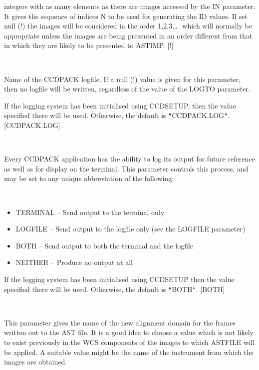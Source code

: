 \documentclass[twoside,11pt]{article}
\newcommand{\htmlref}[2]{#1}
\renewcommand{\_}{\texttt{\symbol{95}}}
\newcommand{\qt}[1]{{\tt "}#1{\tt "}}
\newcommand{\xroutine}[1]{\htmlref{{\sc #1}}{#1}}
\newcommand{\sstsubsection}[1]{ \item[{#1}] \mbox{} \\}
\newcommand{\sstitemlist}[1]{
  \mbox{} \\
  \vspace{-3.5ex}
  \begin{itemize}
     #1
  \end{itemize}
}
\newcommand{\sstitem}{\item}
\newcommand{\sstsubsection}[1]{\item[{#1}]}
\newcommand{\sstitemlist}[1]{
      \begin{itemize}
         #1
      \end{itemize}
      \\
   }
\newcommand{\sstitem}{\item}
\begin{document}
{{{          integers with as many elements as there are images accessed by
          the IN parameter.  It gives the sequence of indices N to be
          used for generating the ID values.   If set null (!) the
          images will be considered in the order 1,2,3,\ldots\ which will
          normally be appropriate unless the images are being presented
          in an order different from that in which they are likely to
          be presented to \xroutine{ASTIMP}.
          [!]
      }
      \sstsubsection{
         LOGFILE = FILENAME (Read)
      } {
         Name of the CCDPACK logfile.  If a null (!) value is given for
         this parameter, then no logfile will be written, regardless of
         the value of the LOGTO parameter.

         If the logging system has been initialised using \xroutine{CCDSETUP},
         then the value specified there will be used. Otherwise, the
         default is \qt{CCDPACK.LOG}.
         [CCDPACK.LOG]
      }
      \sstsubsection{
         LOGTO = LITERAL (Read)
      } {
         Every CCDPACK application has the ability to log its output
         for future reference as well as for display on the terminal.
         This parameter controls this process, and may be set to any
         unique abbreviation of the following:
         \sstitemlist{

            \sstitem
               TERMINAL  -- Send output to the terminal only

            \sstitem
               LOGFILE   -- Send output to the logfile only (see the
                               LOGFILE parameter)

            \sstitem
               BOTH      -- Send output to both the terminal and the
                               logfile

            \sstitem
               NEITHER   -- Produce no output at all

         }
         If the logging system has been initialised using \xroutine{CCDSETUP}
         then the value specified there will be used. Otherwise, the
         default is \qt{BOTH}.
         [BOTH]
      }
      \sstsubsection{
         OUTDOMAIN = LITERAL (Read)
      }{
         This parameter gives the name of the new alignment domain for
         the frames written out to the AST file.  It is a good idea
         to choose a value which is not likely to exist previously
         in the WCS components of the images to which ASTFILE will be
         applied.  A suitable value might be the name of the
         instrument from which the images are obtained.

}}}
\end{document}
